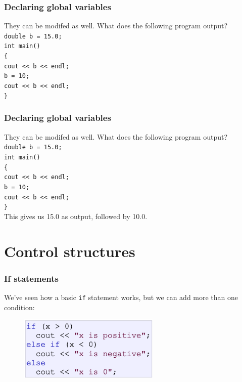 \documentclass{if-beamer}
\begin{document}
\begin{frame}
\frametitle{Declaring global variables}
\vspace{1.5cm}
They can be modifed as well. What does the following program output? \\
{\footnotesize \texttt{double b = 15.0;}} \\
{\footnotesize \texttt{int main()}} \\
{\footnotesize \texttt{\{}} \\
{\footnotesize \texttt{\quad \quad cout << b << endl;}} \\
{\footnotesize \texttt{\quad \quad b = 10;}} \\
{\footnotesize \texttt{\quad \quad cout << b << endl;}} \\
{\footnotesize \texttt{\}}} \\
\end{frame}

\begin{frame}
\frametitle{Declaring global variables}
\vspace{1.5cm}
They can be modifed as well. What does the following program output? \\
{\footnotesize \texttt{double b = 15.0;}} \\
{\footnotesize \texttt{int main()}} \\
{\footnotesize \texttt{\{}} \\
{\footnotesize \texttt{\quad \quad cout << b << endl;}} \\
{\footnotesize \texttt{\quad \quad b = 10;}} \\
{\footnotesize \texttt{\quad \quad cout << b << endl;}} \\
{\footnotesize \texttt{\}}} \\
This gives us 15.0 as output, followed by 10.0.
\end{frame}

\section{Control structures}

\begin{frame}
\frametitle{If statements}
\vspace{2cm}
We've seen how a basic \texttt{if} statement works, but we can add more
than one condition:
\begin{figure}
\center
\includegraphics[width=0.6\textwidth]{figures/if.png}
\end{figure}
\end{frame}
\end{document}
